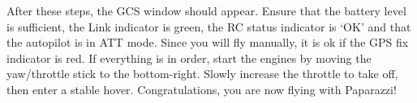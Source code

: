 After these steps, the GCS window should appear.
Ensure that the battery level is sufficient, the Link indicator is green, the RC status indicator is `OK' and that the autopilot is in ATT mode. Since you will fly manually, it is ok if the GPS fix indicator is red.
If everything is in order, start the engines by moving the yaw/throttle stick to the bottom-right. Slowly increase the throttle to take off, then enter a stable hover. Congratulations, you are now flying with Paparazzi!

